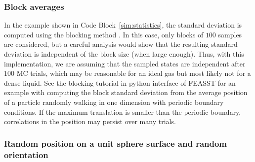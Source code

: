 \documentclass[
  9pt,
  bestpractices,
]{livecoms}
\begin{document}
\subsubsection{\label{sec:block_av}Block averages}

In the example shown in Code Block~\ref{sim:statistics}, the standard deviation is computed using the blocking method \cite{flyvbjerg_error_1989}.
In this case, only blocks of $100$ samples are considered, but a careful analysis would show that the resulting standard deviation is independent of the block size (when large enough).
Thus, with this implementation, we are assuming that the sampled states are independent after $100$ MC trials, which may be reasonable for an ideal gas but most likely not for a dense liquid.
See the blocking tutorial in python interface of FEASST \cite{hatch_monte_2024} for an example with computing the block standard deviation from the average position of a particle randomly walking in one dimension with periodic boundary conditions.
If the maximum translation is smaller than the periodic boundary, correlations in the position may persist over many trials.

\begin{figure}

\end{figure}

\subsubsection{\label{sec:unit_sphere}Random position on a unit sphere surface and random orientation}
\end{document}
